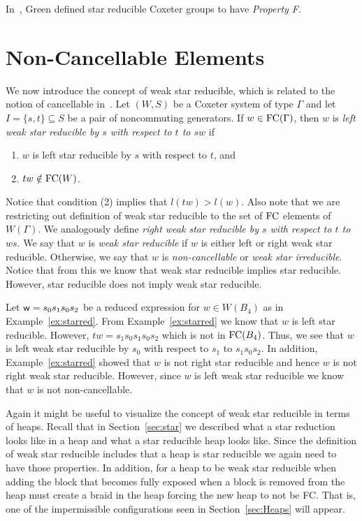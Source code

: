 In~\cite{Green2007}, Green defined star reducible Coxeter groups to have \emph{Property F}.  

\section{Non-Cancellable Elements}
 
We now introduce the concept of weak star reducible, which is related to the notion of cancellable in~\cite{Fan1997}. Let $(W,S)$ be a Coxeter system of type $\Gamma$ and let $I=\{s,t\} \subseteq S$ be a pair of noncommuting generators. If $w  \in \mathrm{FC}(\Gamma)$, then $w$ is \emph{left weak star reducible by $s$ with respect to $t$ to $sw$} if
\begin{enumerate}
\item $w$ is left star reducible by $s$ with respect to $t$, and
\item $tw \notin \mathrm{FC}(W)$.	
\end{enumerate}
Notice that condition (2) implies that $l(tw)>l(w)$. Also note that we are restricting out definition of weak star reducible to the set of $\mathrm{FC}$ elements of $W(\Gamma)$. We analogously define \emph{right weak star reducible by $s$ with respect to $t$ to $ws$}. We say that $w$ is \emph{weak star reducible} if $w$ is either left or right weak star reducible. Otherwise, we say that $w$ is \emph{non-cancellable} or \emph{weak star irreducible}. Notice that from this we know that weak star reducible implies star reducible. However, star reducible does not imply weak star reducible.

\begin{example}\label{ex:noncancel}
 Let $\mathsf{w}=s_0s_1s_0s_2$ be a reduced expression for $w \in W(B_4)$ as in Example~\ref{ex:starred}. From Example~\ref{ex:starred} we know that $w$ is left star reducible. However, $tw=s_1s_0s_1s_0s_2$ which is not in $\mathrm{FC}(B_4)$. Thus, we see that $w$ is left weak star reducible by $s_0$ with respect to $s_1$ to $s_1s_0s_2$. In addition, Example~\ref{ex:starred} showed that $w$ is not right star reducible and hence $w$ is not right weak star reducible. However, since $w$ is left weak star reducible we know that $w$ is not non-cancellable.
\end{example}

Again it might be useful to visualize the concept of weak star reducible in terms of heaps. Recall that in Section~\ref{sec:star} we described what a star reduction looks like in a heap and what a star reducible heap looks like. Since the definition of weak star reducible includes that a heap is star reducible we again need to have those properties. In addition, for a heap to be weak star reducible when adding the block that becomes fully exposed when a block is removed from the heap must create a braid in  the heap forcing the new heap to not be FC. That is, one of the impermissible configurations seen in Section~\ref{sec:Heaps} will appear.

